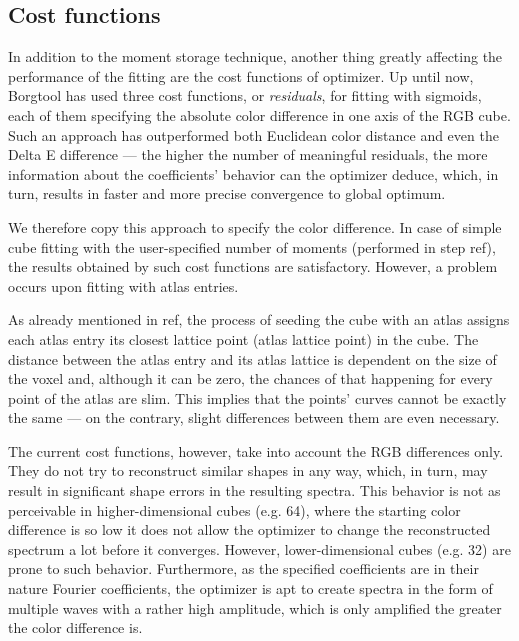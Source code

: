 \subsection{Cost functions} \label{ssec:costFunctions}

In addition to the moment storage technique, another thing greatly affecting the performance of the fitting are the cost functions of optimizer. Up until now, Borgtool has used three cost functions, or \emph{residuals}, for fitting with sigmoids, each of them specifying the absolute color difference in one axis of the RGB cube. Such an approach has outperformed both Euclidean color distance and even the Delta E difference --- the higher the number of meaningful residuals, the more information about the coefficients' behavior can the optimizer deduce, which, in turn, results in faster and more precise convergence to global optimum.

We therefore copy this approach to specify the color difference. In case of simple cube fitting with the user-specified number of moments (performed in step ref), the results obtained by such cost functions are satisfactory. However, a problem occurs upon fitting with atlas entries.

As already mentioned in ref, the process of seeding the cube with an atlas assigns each atlas entry its closest lattice point (atlas lattice point) in the cube. The distance between the atlas entry and its atlas lattice is dependent on the size of the voxel and, although it can be zero, the chances of that happening for every point of the atlas are slim. This implies that the points' curves cannot be exactly the same --- on the contrary, slight differences between them are even necessary.

The current cost functions, however, take into account the RGB differences only. They do not try to reconstruct similar shapes in any way, which, in turn, may result in significant shape errors in the resulting spectra. This behavior is not as perceivable in higher-dimensional cubes (e.g. 64), where the starting color difference is so low it does not allow the optimizer to change the reconstructed spectrum a lot before it converges. However, lower-dimensional cubes (e.g. 32) are prone to such behavior. Furthermore, as the specified coefficients are in their nature Fourier coefficients, the optimizer is apt to create spectra in the form of multiple waves with a rather high amplitude, which is only amplified the greater the color difference is.

